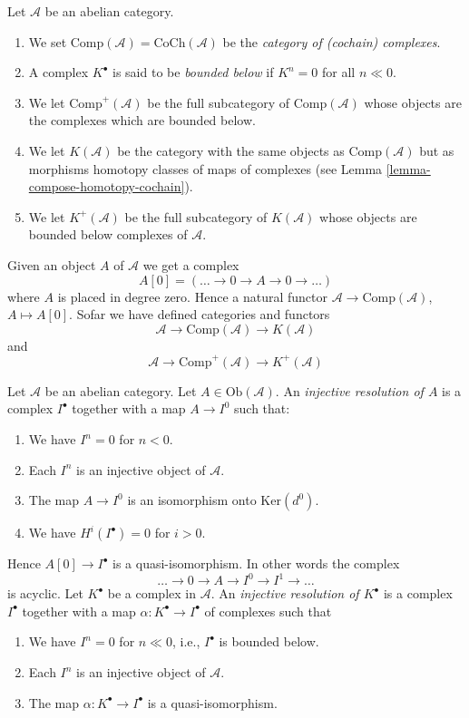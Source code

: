 \begin{definition}
\label{definition-complexes-notation}
Let $\mathcal{A}$ be an abelian category.
\begin{enumerate}
\item We set $\text{Comp}(\mathcal{A}) = \text{CoCh}(\mathcal{A})$
be the {\it category of (cochain) complexes}.
\item A complex $K^\bullet$ is said to be
{\it bounded below} if $K^n = 0$ for all $n \ll 0$.
\item We let $\text{Comp}^{+}(\mathcal{A})$ be the full subcategory
of $\text{Comp}(\mathcal{A})$ whose objects are the complexes
which are bounded below.
\item We let $K(\mathcal{A})$ be the category with the same objects
as $\text{Comp}(\mathcal{A})$ but as morphisms homotopy classes of
maps of complexes (see Lemma \ref{lemma-compose-homotopy-cochain}).
\item We let $K^{+}(\mathcal{A})$ be the full subcategory of
$K(\mathcal{A})$ whose objects are bounded below complexes
of $\mathcal{A}$.
\end{enumerate}
\end{definition}

\noindent
Given an object $A$ of $\mathcal{A}$ we get a complex
$$
A[0] = ( \ldots \to 0 \to A \to 0 \to \ldots )
$$
where $A$ is placed in degree zero. Hence a natural functor
$\mathcal{A} \to \text{Comp}(\mathcal{A})$, $A \mapsto A[0]$.
Sofar we have defined categories and functors
$$
\mathcal{A} \to \text{Comp}(\mathcal{A}) \to K(\mathcal{A})
$$
and
$$
\mathcal{A} \to \text{Comp}^{+}(\mathcal{A}) \to K^{+}(\mathcal{A})
$$

\begin{definition}
\label{definition-injective-resolution}
Let $\mathcal{A}$ be an abelian category.
Let $A \in \text{Ob}(\mathcal{A})$.
An {\it injective resolution of $A$} is a complex
$I^\bullet$ together with a map $A \to I^0$ such
that:
\begin{enumerate}
\item We have $I^n = 0$ for $n < 0$.
\item Each $I^n$ is an injective object of $\mathcal{A}$.
\item The map $A \to I^0$ is an isomorphism onto $\text{Ker}(d^0)$.
\item We have $H^i(I^\bullet) = 0$ for $i > 0$.
\end{enumerate}
Hence $A[0] \to I^\bullet$ is a quasi-isomorphism.
In other words the complex
$$
\ldots \to 0 \to A \to I^0 \to I^1 \to \ldots
$$
is acyclic.
Let $K^\bullet$ be a complex in $\mathcal{A}$.
An {\it injective resolution of $K^\bullet$} is a complex
$I^\bullet$ together with a map $\alpha : K^\bullet \to I^\bullet$
of complexes such that
\begin{enumerate}
\item We have $I^n = 0$ for $n \ll 0$, i.e., $I^\bullet$ is bounded below.
\item Each $I^n$ is an injective object of $\mathcal{A}$.
\item The map $\alpha : K^\bullet \to I^\bullet$ is a
quasi-isomorphism.
\end{enumerate}
\end{definition}

